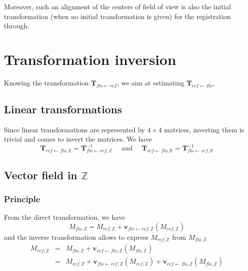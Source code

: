 Moreover, such an alignment of the centers of field of view is also the initial transformation (when no initial transformation is given) for the registration through\blockmatching{}.


\section{Transformation inversion}

Knowing the transformation $\mathbf{T}_{flo \leftarrow ref}$, we aim at estimating $\mathbf{T}_{ref \leftarrow flo}$,

\subsection{Linear transformations}

Since linear transformations are represented by $4 \times 4$ matrices, inverting them is trivial and comes to invert the matrices. We have
\begin{displaymath}
\mathbf{T}_{ref \leftarrow flo, \mathbb{Z}} =
\mathbf{T}_{flo \leftarrow ref, \mathbb{Z}}^{-1}
\quad \mbox{ and } \quad
\mathbf{T}_{ref \leftarrow flo, \mathbb{R}} =
\mathbf{T}_{flo \leftarrow ref, \mathbb{R}}^{-1}
\end{displaymath}

\subsection{Vector field in $\mathbb{Z}$}

\subsubsection{Principle}

From the direct transformation, we have
\begin{displaymath}
M_{flo,\mathbb{Z}} = 
M_{ref,\mathbb{Z}} 
+ \mathbf{v}_{flo \leftarrow ref, \mathbb{Z}}(M_{ref,\mathbb{Z}} )
\end{displaymath}
and the inverse transformation allows to express $M_{ref,\mathbb{Z}}$ from $M_{flo,\mathbb{Z}}$
\begin{eqnarray*}
M_{ref,\mathbb{Z}} & = &
M_{flo,\mathbb{Z}} 
+ \mathbf{v}_{ref \leftarrow flo, \mathbb{Z}}(M_{flo,\mathbb{Z}} ) \\
& = &
M_{ref,\mathbb{Z}} 
+ \mathbf{v}_{flo \leftarrow ref, \mathbb{Z}}(M_{ref,\mathbb{Z}} )
+ \mathbf{v}_{ref \leftarrow flo, \mathbb{Z}}(M_{flo,\mathbb{Z}} )
\end{eqnarray*}

